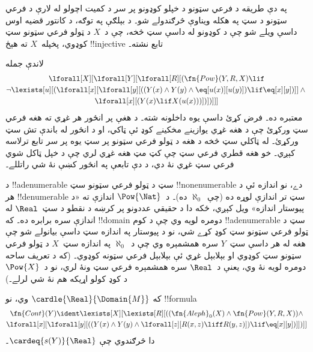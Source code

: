 \documentclass[../../../include/open-logic-section]{subfiles}
\begin{document}
\begin{explain}
په دې طريقه د فرعي سټونو د خپلو کوډونو پر سر د کميت
اچولو له لارې د فرعي سټونو د سټ په هکله ويناوې څرګندولے
شو۔ د بېلګې په توګه، د کانتور قضيه اوس داسې ويلے شو
چې د کوډونو له داسې سټ څخه، چې د~$X$ د
ټولو فرعي سټونو سټ کوډوي، پخپله~$X$ ته هېڅ
!!{injective} تابع نشته۔
\end{explain}

\begin{prop}
لاندې جمله
\begin{multline*}
  \lforall[X][\lforall[Y][\lforall[R][(\fn{Pow}(Y, R, X) \lif \\
      \lnot \lexists[u][(\lforall[x][\lforall[y][((Y(x)\land Y(y)\land \eq[u(x)][u(y)]) \lif
            \eq[x][y])]] \land {}\\
        \lforall[x][(Y(x) \lif X(u(x)))])])]]]
\end{multline*}
معتبره ده۔ فرض کړئ داسې يوه داخلونه شته۔ د هغې پر انځور هر غړي ته هغه فرعي سټ ورکړئ چې د هغه غړي يوازينے مخکينے کوډ ئې ټاکي، او د انځور له باندې تش سټ ورکړئ۔ له ټاکلي سټ څخه د هغه د ټولو فرعي سټونو پر سټ يوه پر سر تابع ترلاسه کېږي۔ خو هغه قطري فرعي سټ چې کټ مټ هغه غړي لري چې د خپل ټاکل شوي فرعي سټ غړي نۀ دي، د دې تابعې په انځور کښې نۀ شي راتللے۔
\end{prop}

\begin{explain}
د !!a{denumerable} سټ د ټولو فرعي سټونو سټ
!!{nonenumerable} دے، نو اندازه ئې د هر !!{denumerable}
سټ تر اندازې لوړه ده (چې~$\aleph_0$ ده)۔ د~$\Pow{\Nat}$
اندازې ته «د پيوستار اندازه» ويل کېږي، ځکه دا د حقيقي
عددونو پر کرښه د نقطو د سټ~$\Real$ له اندازې سره برابره
ده۔ که !!{domain} دومره لويه وي چې د کوم
!!a{denumerable} سټ د ټولو فرعي سټونو سټ کوډ کړے شي،
نو د پيوستار په اندازه سټ داسې بيانولے شو چې هغه له
هر داسې سټ~$Y$ سره همشمېره وي چې د~$\aleph_0$
په اندازه سټ~$X$ د ټولو فرعي سټونو سټ کوډوي او بېلابېل
غړي ئې بېلابېل فرعي سټونه کوډوي۔
(که د تعريف ساحه دومره لويه نۀ وي، يعنې د~$\Real$
سره همشمېره فرعي سټ ونۀ لري، نو د~$\Pow{X}$ د کوډ
کولو اړيکه هم نۀ شي لرلے۔)
\end{explain}

\begin{prop}
که $\cardle{\Real}{\Domain{M}}$ وي، نو !!{formula}
\begin{multline*}
\fn{Cont}(Y) \ident
\lexists[X][\lexists[R][((\fn{Aleph}_0(X) \land
      \fn{Pow}(Y, R, X)) \land \\
      \lforall[x][\lforall[y][((Y(x) \land {}
      Y(y) \land \lforall[z][R(x,z) \liff R(y,z)]) \lif \eq[x][y])]])]]
\end{multline*}
دا څرګندوي چې $\cardeq{s(Y)}{\Real}$۔
\end{prop}
\end{document}
